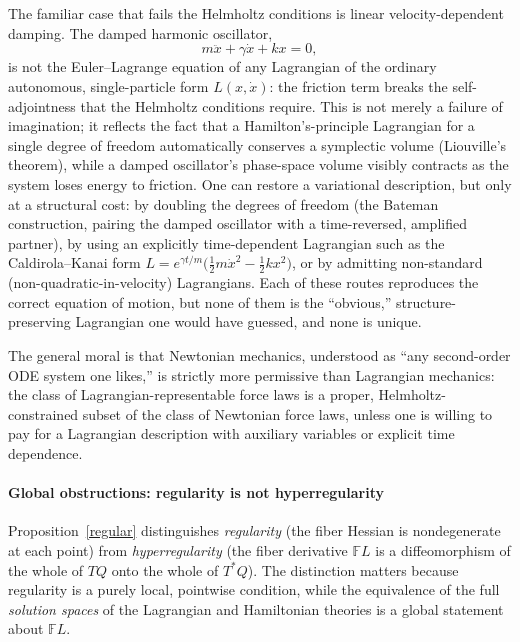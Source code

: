 The familiar case that fails the Helmholtz conditions is linear
velocity-dependent damping. The damped harmonic oscillator,
\begin{equation}
m\ddot x + \gamma \dot x + k x = 0 ,
\end{equation}
is not the Euler--Lagrange equation of any Lagrangian of the ordinary
autonomous, single-particle form $L(x,\dot x)$: the friction term breaks the
self-adjointness that the Helmholtz conditions require. This is not merely a
failure of imagination; it reflects the fact that a Hamilton's-principle
Lagrangian for a single degree of freedom automatically conserves a symplectic
volume (Liouville's theorem), while a damped oscillator's phase-space volume
visibly contracts as the system loses energy to friction. One can restore a
variational description, but only at a structural cost: by doubling the degrees
of freedom (the Bateman construction, pairing the damped oscillator with a
time-reversed, amplified partner), by using an explicitly time-dependent
Lagrangian such as the Caldirola--Kanai form $L = e^{\gamma t/m}\big(\tfrac12
m\dot x^2 - \tfrac12 kx^2\big)$, or by admitting non-standard
(non-quadratic-in-velocity) Lagrangians. Each of these routes reproduces the
correct equation of motion, but none of them is the ``obvious,''
structure-preserving Lagrangian one would have guessed, and none is unique.

The general moral is that Newtonian mechanics, understood as ``any second-order
ODE system one likes,'' is strictly more permissive than Lagrangian mechanics:
the class of Lagrangian-representable force laws is a proper,
Helmholtz-constrained subset of the class of Newtonian force laws, unless one
is willing to pay for a Lagrangian description with auxiliary variables or
explicit time dependence.

\paragraph{Global obstructions: regularity is not hyperregularity}
Proposition~\ref{regular} distinguishes \emph{regularity} (the fiber
Hessian is nondegenerate at each point) from \emph{hyperregularity} (the fiber
derivative $\mathbb{F}L$ is a diffeomorphism of the whole of $TQ$ onto the
whole of $T^*Q$). The distinction matters because regularity is a purely local,
pointwise condition, while the equivalence of the full \emph{solution spaces}
of the Lagrangian and Hamiltonian theories is a global statement about
$\mathbb{F}L$.

